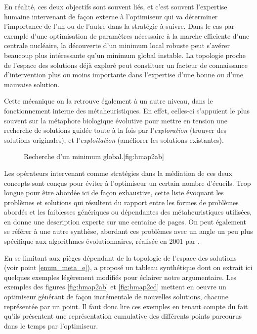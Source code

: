En réalité, ces deux objectifs sont souvent liés, et c'est souvent l'expertise humaine intervenant de façon externe à l'optimiseur qui va déterminer l'importance de l'un ou de l'autre dans la stratégie à suivre. Dans le cas par exemple d'une optimisation de paramètres nécessaire à la marche efficiente d'une centrale nucléaire, la découverte d'un minimum local robuste peut s'avérer beaucoup plus intéressante qu'un minimum global instable. La topologie proche de l'espace des solutions déjà exploré peut constituer un facteur de connaissance d'intervention plus ou moins importante dans l'expertise d'une bonne ou d'une mauvaise solution.

Cette mécanique on la retrouve également à un autre niveau, dans le fonctionnement interne des métaheuristiques. En effet, celles-ci s'appuient le plus souvent sur la métaphore biologique évolutive pour mettre en tension une recherche de solutions guidée toute à la fois par l'\textit{exploration} (trouver des solutions originales), et l'\textit{exploitation} (améliorer les solutions existantes).

\begin{figure}[!htbp]
\begin{sidecaption}[fortoc]{Recherche d'un minimum global.}[fig:hmap2ab]
 \centering
 \qquad
\end{sidecaption}
\end{figure}

Les opérateurs intervenant comme stratégies dans la médiation de ces deux concepts sont conçus pour éviter à l'optimiseur un certain nombre d'écueils. Trop longue pour être abordée ici de façon exhaustive, cette liste évoquant les problèmes et solutions qui résultent du rapport entre les formes de problèmes abordés et les faiblesses génériques ou dépendantes des métaheuristiques utilisées, \textcite{Weise2011} en donne une description experte sur une centaine de pages. On peut également se référer à une autre synthèse, abordant ces problèmes avec un angle un peu plus spécifique aux algorithmes évolutionnaires, réalisée en 2001 par \textcite[316-445]{Deb2001}.

En se limitant aux pièges dépendant de la topologie de l'espace des solutions (voir point \ref{enum_meta_e}), \textcite[140]{Weise2011} a proposé un tableau synthétique dont on extrait ici quelques exemples légèrement modifiés pour éclairer notre argumentaire. Les exemples des figures \ref{fig:hmap2ab} et \ref{fig:hmap2cd} mettent en oeuvre un optimiseur générant de façon incrémentale de nouvelles solutions, chacune représentée par un point. Il faut donc lire ces exemples en tenant compte du fait qu'ils présentent une représentation cumulative des différents points parcourus dans le temps par l'optimiseur.

